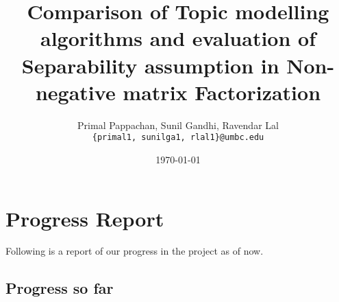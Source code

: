 \documentclass[a4paper,11pt]{article}
\begin{document}

\title{Comparison of Topic modelling algorithms and evaluation of Separability assumption in Non-negative matrix Factorization}
\author{Primal Pappachan, Sunil Gandhi, Ravendar Lal \\ 
\texttt{\{primal1, sunilga1, rlal1\}@umbc.edu}}
\date{\today}
\maketitle



\section{Progress Report}
Following is a report of our progress in the project as of now.
\subsection{Progress so far}
\end{document}
